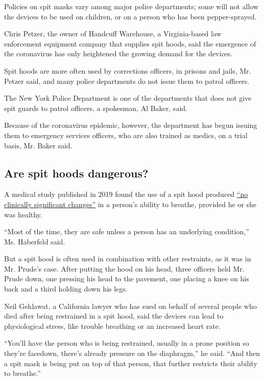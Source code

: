 Policies on spit masks vary among major police departments; some will
not allow the devices to be used on children, or on a person who has
been pepper-sprayed.

Chris Petzer, the owner of Handcuff Warehouse, a Virginia-based law
enforcement equipment company that supplies spit hoods, said the
emergence of the coronavirus has only heightened the growing demand for
the devices.

Spit hoods are more often used by corrections officers, in prisons and
jails, Mr. Petzer said, and many police departments do not issue them to
patrol officers.

The New York Police Department is one of the departments that does not
give spit guards to patrol officers, a spokesman, Al Baker, said.

Because of the coronavirus epidemic, however, the department has begun
issuing them to emergency services officers, who are also trained as
medics, on a trial basis, Mr. Baker said.

\hypertarget{are-spit-hoods-dangerous}{%
\subsection{Are spit hoods dangerous?}\label{are-spit-hoods-dangerous}}

A medical study published in 2019 found the use of a spit hood produced
\href{https://www.ajemjournal.com/article/S0735-6757(18)30806-4/fulltext}{``no
clinically significant changes''} in a person's ability to breathe,
provided he or she was healthy.

``Most of the time, they are safe unless a person has an underlying
condition,'' Ms. Haberfeld said.

But a spit hood is often used in combination with other restraints, as
it was in Mr. Prude's case. After putting the hood on his head, three
officers held Mr. Prude down, one pressing his head to the pavement, one
placing a knee on his back and a third holding down his legs.

Neil Gehlawat, a California lawyer who has sued on behalf of several
people who died after being restrained in a spit hood, said the devices
can lead to physiological stress, like trouble breathing or an increased
heart rate.

``You'll have the person who is being restrained, usually in a prone
position so they're facedown, there's already pressure on the
diaphragm,'' he said. ``And then a spit mask is being put on top of that
person, that further restricts their ability to breathe.''

